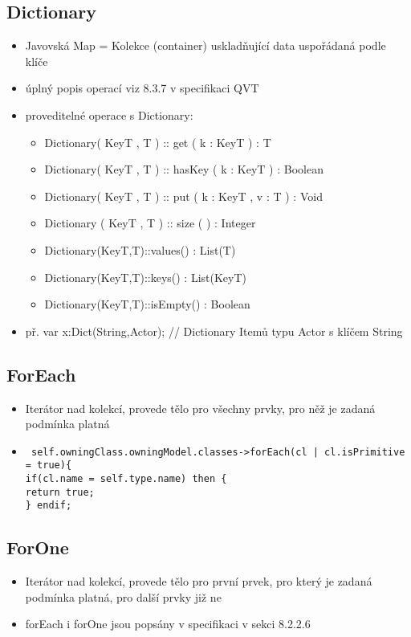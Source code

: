 \documentclass[11pt,a4paper]{article}   	%
\begin{document}
\subsection{Dictionary}
\begin {itemize}
  	\item 	Javovská Map = Kolekce (container) uskladňující data uspořádaná
			podle klíče 
	\item	úplný popis operací viz 8.3.7 v specifikaci QVT
	\item 	proveditelné operace s Dictionary:\\
	 		\begin {itemize}
	 		  	\item 	Dictionary( KeyT , T ) :: get ( k : KeyT ) : T
				\item 	Dictionary( KeyT , T ) :: hasKey ( k : KeyT ) : Boolean
				\item 	Dictionary( KeyT , T ) :: put ( k : KeyT , v : T ) : Void
				\item 	Dictionary ( KeyT , T ) :: size ( ) : Integer
				\item	Dictionary(KeyT,T)::values() : List(T)
				\item	Dictionary(KeyT,T)::keys() : List(KeyT)
				\item	Dictionary(KeyT,T)::isEmpty() : Boolean
			\end{itemize}
	\item	př. var x:Dict(String,Actor); // Dictionary Itemů typu Actor s klíčem String
\end{itemize}

\subsection{ForEach}
\begin{itemize}
  	\item	Iterátor nad kolekcí, provede tělo pro všechny prvky, pro něž je
			zadaná podmínka platná
	\item	\texttt {
						self.owningClass.owningModel.classes->forEach(cl | cl.isPrimitive =
						true)\{\\ if(cl.name = self.type.name) then \{\\ return true; \\ \} endif;
			}
	 
\end{itemize}

\subsection{ForOne}
\begin{itemize}
  	\item 	Iterátor nad kolekcí, provede tělo pro první prvek, pro který je
			zadaná podmínka platná, pro další prvky již ne
	\item	forEach i forOne jsou popsány v specifikaci v sekci 8.2.2.6
\end{itemize} 
\end{document}
